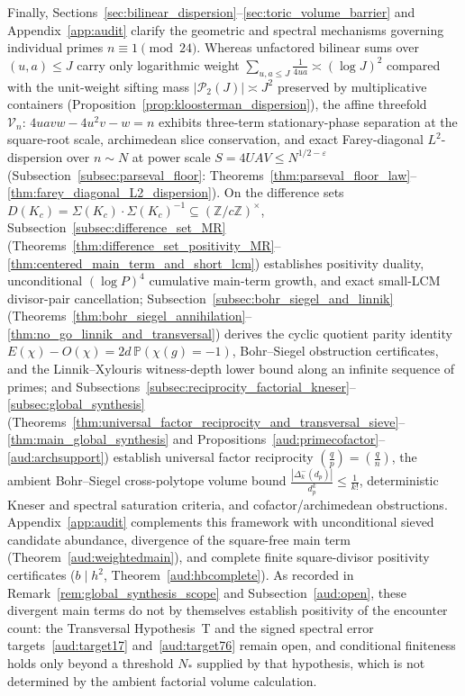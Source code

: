 \documentclass[11pt, a4paper]{article}
\theoremstyle{plain}
\theoremstyle{definition}
\newcommand{\Z}{\mathbb{Z}}
\newcommand{\leg}[2]{\left(\frac{#1}{#2}\right)}
\begin{document}
Finally, Sections~\ref{sec:bilinear_dispersion}--\ref{sec:toric_volume_barrier} and Appendix~\ref{app:audit} clarify the geometric and spectral mechanisms governing individual primes $n\equiv1\pmod{24}$. Whereas unfactored bilinear sums over $(u,a)\le J$ carry only logarithmic weight $\sum_{u,a\le J}\frac{1}{4ua}\asymp(\log J)^{2}$ compared with the unit-weight sifting mass $|\mathcal{P}_2(J)|\asymp J^{2}$ preserved by multiplicative containers (Proposition~\ref{prop:kloosterman_dispersion}), the affine threefold $\mathcal{V}_n:\,4uavw-4u^{2}v-w=n$ exhibits three-term stationary-phase separation at the square-root scale, archimedean slice conservation, and exact Farey-diagonal $L^{2}$-dispersion over $n\sim N$ at power scale $S=4UAV\le N^{1/2-\varepsilon}$ (Subsection~\ref{subsec:parseval_floor}: Theorems~\ref{thm:parseval_floor_law}--\ref{thm:farey_diagonal_L2_dispersion}). On the difference sets $D(K_c)=\Sigma(K_c)\cdot\Sigma(K_c)^{-1}\subseteq(\Z/c\Z)^{\times}$, Subsection~\ref{subsec:difference_set_MR} (Theorems~\ref{thm:difference_set_positivity_MR}--\ref{thm:centered_main_term_and_short_lcm}) establishes positivity duality, unconditional $(\log P)^{4}$ cumulative main-term growth, and exact small-LCM divisor-pair cancellation; Subsection~\ref{subsec:bohr_siegel_and_linnik} (Theorems~\ref{thm:bohr_siegel_annihilation}--\ref{thm:no_go_linnik_and_transversal}) derives the cyclic quotient parity identity $E(\chi)-O(\chi)=2d\,\mathbb{P}(\chi(g)=-1)$, Bohr--Siegel obstruction certificates, and the Linnik--Xylouris witness-depth lower bound along an infinite sequence of primes; and Subsections~\ref{subsec:reciprocity_factorial_kneser}--\ref{subsec:global_synthesis} (Theorems~\ref{thm:universal_factor_reciprocity_and_transversal_sieve}--\ref{thm:main_global_synthesis} and Propositions~\ref{aud:primecofactor}--\ref{aud:archsupport}) establish universal factor reciprocity $\leg{q}{p}=\leg{q}{n}$, the ambient Bohr--Siegel cross-polytope volume bound $\frac{|\Delta_k^{-}(d_p)|}{d_p^{k}}\le\frac{1}{k!}$, deterministic Kneser and spectral saturation criteria, and cofactor/archimedean obstructions. Appendix~\ref{app:audit} complements this framework with unconditional sieved candidate abundance, divergence of the square-free main term (Theorem~\ref{aud:weightedmain}), and complete finite square-divisor positivity certificates ($b\mid h^{2}$, Theorem~\ref{aud:hbcomplete}). As recorded in Remark~\ref{rem:global_synthesis_scope} and Subsection~\ref{aud:open}, these divergent main terms do not by themselves establish positivity of the encounter count: the Transversal Hypothesis~T and the signed spectral error targets~\eqref{aud:target17} and~\eqref{aud:target76} remain open, and conditional finiteness holds only beyond a threshold $N_{\ast}$ supplied by that hypothesis, which is not determined by the ambient factorial volume calculation.
\end{document}
